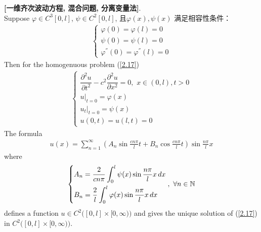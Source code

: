 	\begin{thm}\label{thm 2.3.5}
		\textbf{[一维齐次波动方程, 混合问题, 分离变量法]}. \\
		Suppose $\varphi \in C^3[0 , l]$, $\psi \in C^2[0 , l]$, 且$\varphi(x) , \psi(x)$ 满足相容性条件：
		\begin{align*}
			\begin{cases}
				\varphi(0) = \varphi(l) = 0 \\
				\psi(0) = \psi(l) = 0 \\
				\varphi^{''}(0) = \varphi^{''}(l) = 0
			\end{cases}
		\end{align*}
		Then for the homogenuous problem (\ref{2.17})
		\begin{align*}
			\begin{cases}
				\dfrac{\partial^2 u}{\partial t^2} - c^2 \dfrac{\partial^2 u}{\partial x^2} = 0 , \,\, x \in (0 , l) , t > 0 \\
				u \Big|_{t = 0} = \varphi(x) \\
				u_t \Big|_{t = 0} = \psi(x) \\
				u(0 , t) = u(l , t) = 0
			\end{cases}
		\end{align*}
		The formula
		\begin{align}
			u(x) = \sum_{n = 1}^{\infty} \left( A_n \sin \frac{cn\pi}{l} t + B_n \cos \frac{cn\pi}{l} t \right) \sin \frac{n\pi}{l} x \label{2.18}
		\end{align}
		where 
		\begin{align}
			\begin{dcases}
				A_n = \dfrac{2}{cn\pi} \int_{0}^l \psi(x) \sin \frac{n\pi}{l} x \, dx \\
				B_n = \dfrac{2}{l} \int_{0}^l \varphi(x) \sin \frac{n\pi}{l} x \, dx 
			\end{dcases}, \,\, \forall n \in \mathbb{N} \label{2.19}
		\end{align}
		defines a function $u \in C^{2}\Big( [0 , l] \times [0 , \infty) \Big)$ and gives the unique solution of (\ref{2.17}) in $C^{2}\Big( [0 , l] \times [0 , \infty) \Big)$. 
		
		\vspace*{6em}
		

\end{thm}
